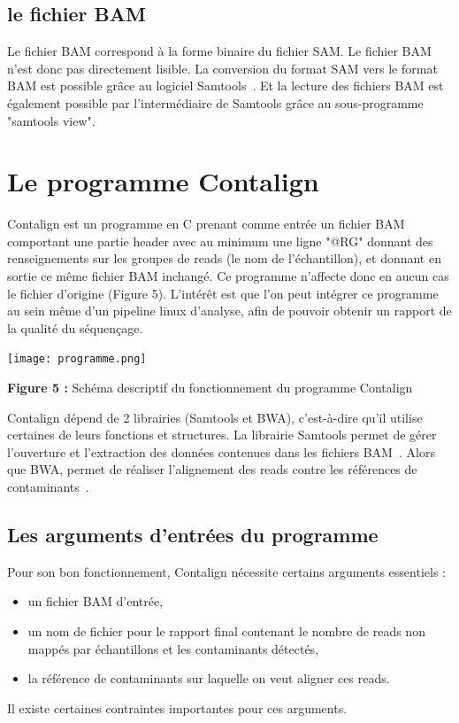 \documentclass[a4paper,12pt]{article}
\begin{document}
\subsection{le fichier BAM}
Le fichier BAM correspond à la forme binaire du fichier SAM. Le fichier BAM n'est donc pas directement lisible. La conversion du format SAM vers le format BAM est possible grâce au logiciel Samtools~\cite{SAM2}. Et la lecture des fichiers BAM est également possible par l'intermédiaire de Samtools grâce au sous-programme "samtools view". 
 \\
 


\section{Le programme Contalign}
Contalign est un programme en C prenant comme entrée un fichier BAM comportant une partie header avec au minimum une ligne "@RG" donnant des renseignements sur les groupes de reads (le nom de l'échantillon), et donnant en sortie ce même fichier BAM inchangé. Ce programme n'affecte donc en aucun cas le fichier d'origine (Figure 5). L'intérêt est que l'on peut intégrer ce programme au sein même d'un pipeline linux d'analyse, afin de pouvoir obtenir un rapport de la qualité du séquençage. 
 
\begin{center}
\texttt{[image: programme.png]}~
\end{center}
\begin{center}
\textbf{ Figure 5 : }Schéma descriptif du fonctionnement du programme Contalign
\end{center}
Contalign dépend de 2 librairies (Samtools et BWA), c'est-à-dire qu'il utilise certaines de leurs fonctions et structures. La librairie Samtools permet de gérer l'ouverture et l'extraction des données contenues dans les fichiers BAM~\cite{SAM}. Alors que BWA, permet de réaliser l'alignement des reads contre les références de contaminants~\cite{BWA}. 
\\
\subsection{Les arguments d'entrées du programme}

Pour son bon fonctionnement, Contalign nécessite certains arguments essentiels : 
\begin{itemize}
\item un fichier BAM d'entrée, 
\item un nom de fichier pour le rapport final contenant le nombre de reads non mappés par échantillons et les contaminants détectés, 
\item la référence de contaminants sur laquelle on veut aligner ces reads.
\end{itemize}
Il existe certaines contraintes importantes pour ces arguments. \\
\end{document}
